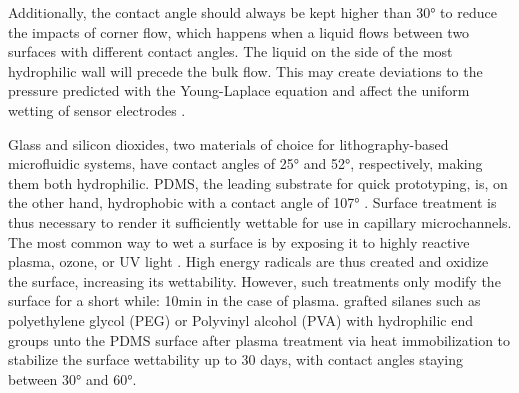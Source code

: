 Additionally, the contact angle should always be kept higher than 30° to reduce the impacts of corner flow, which happens when a liquid flows between two surfaces with different contact angles. The liquid on the side of the most hydrophilic wall will precede the bulk flow. This may create deviations to the pressure predicted with the Young-Laplace equation and affect the uniform wetting of sensor electrodes \cite{Olanrewaju2018}. \par

Glass and silicon dioxides, two materials of choice for lithography-based microfluidic systems, have contact angles of 25° and 52°, respectively, making them both hydrophilic. PDMS, the leading substrate for quick prototyping, is, on the other hand, hydrophobic with a contact angle of 107° \cite{Olanrewaju2018,Trantidou2017}. Surface treatment is thus necessary to render it sufficiently wettable for use in capillary microchannels. The most common way to wet a surface is by exposing it to highly reactive plasma, ozone, or UV light \cite{Ufluidix}. High energy radicals are thus created and oxidize the surface, increasing its wettability. However, such treatments only modify the surface for a short while: 10min in the case of plasma. \citep{Trantidou2017} grafted silanes such as polyethylene glycol (PEG) or Polyvinyl alcohol (PVA) with hydrophilic end groups unto the PDMS surface after plasma treatment via heat immobilization to stabilize the surface wettability up to 30 days, with contact angles staying between 30° and 60°\cite{Olanrewaju2018,Ufluidix,Trantidou2017}. 
